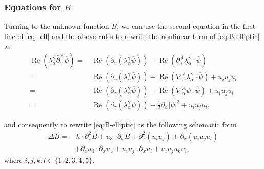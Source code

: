 \documentclass[11pt,letterpaper,reqno]{amsart}
\numberwithin{equation}{section}
\theoremstyle{definition}
\theoremstyle{remark}
\begin{document}
\subsubsection{Equations for $B$}
Turning to the unknown function $ B $, we can use the second equation in the first line of \eqref{eq_ell} and  the above rules   to rewrite the  nonlinear term of  \eqref{eq:B-elliptic} as
\begin{align*}
	\operatorname{Re}\left(\lambda_\alpha^\gamma \bar{\partial}_\gamma^A \overline{\psi}\right)= 	&\,	\operatorname{Re}\left(  \partial_\gamma (\lambda_\alpha^\gamma  \overline{\psi} )\right)- 	\operatorname{Re}\left( \partial_\gamma^A  \lambda_\alpha^\gamma \cdot \overline{\psi}\right)\\
	= 	&\,	\operatorname{Re}\left( \partial_\gamma (\lambda_\alpha^\gamma  \overline{\psi} )\right)- 	\operatorname{Re}\left(\nabla^{A}_\gamma \lambda_{\alpha }^\gamma \cdot \overline{\psi}\right)+u_i u_j u_l\\
	=&\, 	\operatorname{Re}\left( \partial_\gamma (\lambda_\alpha^\gamma  \overline{\psi} )\right)- 	\operatorname{Re}\left(\nabla^{A}_\alpha  \psi  \cdot \overline{\psi}\right)+u_i u_j u_l \\
	=&\, 	\operatorname{Re}\left( \partial_\gamma (\lambda_\alpha^\gamma  \overline{\psi} )\right)- \frac12	\partial_\alpha \left| \psi  \right|^2+u_i u_j u_l.
\end{align*}


 
and consequently to rewrite \eqref{eq:B-elliptic}  as the  following schematic form
\begin{align}
\Delta B
=&\,
h\cdot\partial_x^2B+u_3\cdot\partial_xB
+\partial_x^2(u_i u_j)+\partial_x(u_i u_j u_l)\nonumber \\
&+\partial_xu_4\cdot\partial_xu_5 +u_i u_j\cdot\partial_xu_l+u_i u_j u_k u_l,
\label{eq:B-schematic}
\end{align}
 where $ i,j,k,l \in \{1,2,3,4,5\}. $  
\end{document}
